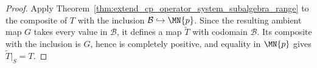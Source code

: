 \begin{proof}\leanok
    Apply Theorem~\ref{thm:extend_cp_operator_system_subalgebra_range} to the
    composite of $T$ with the inclusion $\mathcal B\hookrightarrow\MN{p}$.
    Since the resulting ambient map $G$ takes every value in $\mathcal B$, it
    defines a map $\widetilde T$ with codomain $\mathcal B$. Its composite
    with the inclusion is $G$, hence is completely positive, and equality in
    $\MN{p}$ gives $\widetilde T|_S=T$.
\end{proof}
